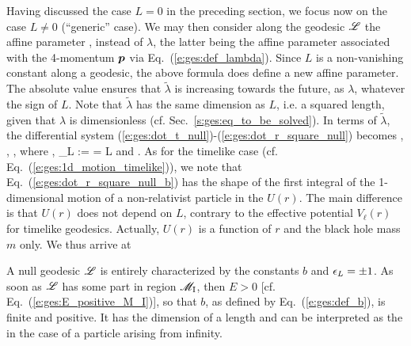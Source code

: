 Having discussed the case $L=0$ in the preceding section, we focus now on the
case $L\not= 0$ (``generic'' case). We may then
consider along the geodesic $\mathscr{L}$ the affine parameter
\be
   ,
\ee
instead of $\lambda$, the latter being the affine parameter associated with the 4-momentum $\bm{p}$
via Eq.~(\ref{e:ges:def_lambda}).
Since $L$ is a non-vanishing constant along a geodesic, the above formula
does define a new affine parameter. The absolute value ensures that
$\tilde{\lambda}$ is increasing towards the future, as $\lambda$, whatever
the sign of $L$. Note that $\tilde{\lambda}$ has the same
dimension as $L$, i.e. a squared length, given that $\lambda$ is dimensionless
(cf. Sec.~\ref{s:ges:eq_to_be_solved}).
In terms of $\tilde{\lambda}$,
the differential system (\ref{e:ges:dot_t_null})-(\ref{e:ges:dot_r_square_null})
becomes
\be \label{e:ges:dot_t_null_b}
   ,
\ee
\be \label{e:ges:dot_ph_null_b}
    ,
\ee
\be \label{e:ges:dot_r_square_null_b}
   ,
\ee
where
\be \label{e:ges:def_b}
     ,
\ee
\be \label{e:gis:def_epsilon_L}
    \eps_L :=  =  L
\ee
and
\be \label{e:ges:eff_pot_null}
    .
\ee
As for the timelike case (cf. Eq.~(\ref{e:ges:1d_motion_timelike})),
we note that Eq.~(\ref{e:ges:dot_r_square_null_b})
has the shape of the first integral of the
1-dimensional motion of a non-relativist particle in the
$U(r)$. The main difference is that $U(r)$ does not depend on $L$, contrary
to the effective potential $V_\ell(r)$ for timelike geodesics. Actually,
$U(r)$ is a function of $r$ and the black hole mass $m$ only.
We thus arrive at
\begin{prop}
A null geodesic $\mathscr{L}$ is entirely characterized by the constants
$b$ and $\epsilon_L = \pm 1$.
As soon as $\mathscr{L}$ has some part in
region $\mathscr{M}_{\rm I}$, then $E>0$ [cf. Eq.~(\ref{e:ges:E_positive_M_I})], so that
$b$, as defined by Eq.~(\ref{e:ges:def_b}), is finite and positive. It has
the dimension of a length and can be interpreted as the
 in the case of a
particle arising from infinity.
\end{prop}
